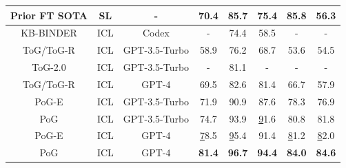 \begin{table}[t]
\begin{tabular}{@{}cccccccc@{}}
Prior FT SOTA & SL    & -             & 70.4\cite{das2021case} & 85.7\cite{rogluo2023reasoning}          & 75.4\cite{gu2022don}          & 85.8\cite{baek2023direct}           & 56.3\cite{kedia-etal-2022-fie}           \\ \midrule
KB-BINDER\cite{li-etal-2023-shot}     & ICL   & Codex         & -    & 74.4          & 58.5          & -                & -              \\
ToG/ToG-R\cite{tog1.0sun2023think}     & ICL   & GPT-3.5-Turbo & 58.9 & 76.2          & 68.7          & 53.6             & 54.5           \\
ToG-2.0\cite{tog2.0ma2024think}       & ICL   & GPT-3.5-Turbo & -    & 81.1         & -             & -                & -              \\
ToG/ToG-R\cite{tog1.0sun2023think}     & ICL   & GPT-4         & 69.5 & 82.6          & 81.4          & 66.7             & 57.9           \\ \midrule
PoG-E         & ICL   & GPT-3.5-Turbo & 71.9 & 90.9          & 87.6          & 78.3             & 76.9           \\
PoG           & ICL   & GPT-3.5-Turbo & 74.7 & 93.9          & {\ul 91.6}          & 80.8             & 81.8           \\
PoG-E         & ICL   & GPT-4         & {\ul78.5} & {\ul 95.4}    & 91.4    & {\ul 81.2}       & {\ul 82.0}       \\
PoG           & ICL   & GPT-4         & \textbf{81.4} & \textbf{96.7} & \textbf{94.4} & \textbf{84.0}      & \textbf{84.6}  \\ \bottomrule
\end{tabular}


% 
\end{table}





